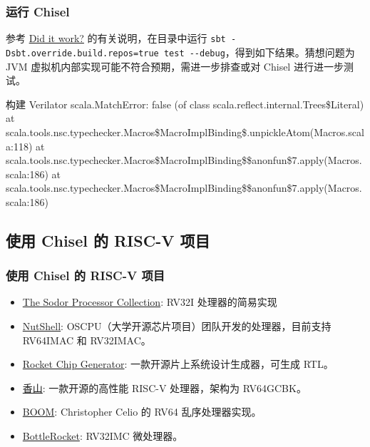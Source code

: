 \documentclass[xcolor=table,dvipsnames,svgnames,aspectratio=169]{ctexbeamer}
\begin{document}
\begin{frame}[fragile]
  \frametitle{运行 Chisel}
  参考 \href{https://github.com/freechipsproject/chisel-template?tab=readme-ov-file#did-it-work}{Did it work?} 的有关说明，在目录中运行 \lstinline|sbt -Dsbt.override.build.repos=true test --debug|，得到如下结果。猜想问题为 JVM 虚拟机内部实现可能不符合预期，需进一步排查或对 Chisel 进行进一步测试。

  \begin{codeblock}[language=bash]{构建 Verilator}
scala.MatchError: false (of class scala.reflect.internal.Trees\$Literal)
        at scala.tools.nsc.typechecker.Macros\$MacroImplBinding\$.unpickleAtom(Macros.scala:118)
        at scala.tools.nsc.typechecker.Macros\$MacroImplBinding\$\$anonfun\$7.apply(Macros.scala:186)
        at scala.tools.nsc.typechecker.Macros\$MacroImplBinding\$\$anonfun\$7.apply(Macros.scala:186)
  \end{codeblock}

  
\end{frame}


\subsection{使用 Chisel 的 RISC-V 项目}

\begin{frame}
  \frametitle{使用 Chisel 的 RISC-V 项目}
  \begin{itemize}
    \item \href{https://github.com/ucb-bar/riscv-sodor}{The Sodor Processor Collection}: RV32I 处理器的简易实现
    \item \href{https://github.com/OSCPU/NutShell}{NutShell}:  OSCPU（大学开源芯片项目）团队开发的处理器，目前支持 RV64IMAC 和 RV32IMAC。
    \item \href{https://github.com/freechipsproject/rocket-chip}{Rocket Chip Generator}: 一款开源片上系统设计生成器，可生成 RTL。
    \item \href{https://github.com/OpenXiangShan/XiangShan}{香山}: 一款开源的高性能 RISC-V 处理器，架构为 RV64GCBK。
    \item \href{https://github.com/ucb-bar/riscv-boom}{BOOM}: Christopher Celio 的 RV64 乱序处理器实现。
    \item \href{https://github.com/google/bottlerocket}{BottleRocket}: RV32IMC 微处理器。
  \end{itemize}
\end{frame}


\makebottom
\end{document}
